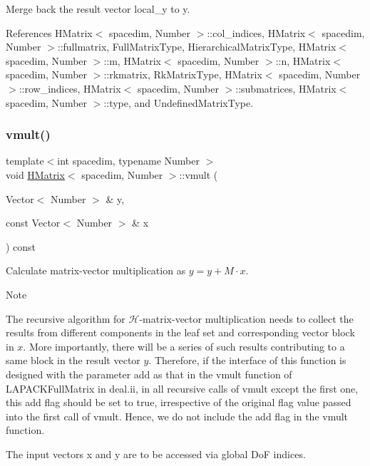 Merge back the result vector {\ttfamily local\+\_\+y} to {\ttfamily y}.

References H\+Matrix$<$ spacedim, Number $>$\+::col\+\_\+indices, H\+Matrix$<$ spacedim, Number $>$\+::fullmatrix, Full\+Matrix\+Type, Hierarchical\+Matrix\+Type, H\+Matrix$<$ spacedim, Number $>$\+::m, H\+Matrix$<$ spacedim, Number $>$\+::n, H\+Matrix$<$ spacedim, Number $>$\+::rkmatrix, Rk\+Matrix\+Type, H\+Matrix$<$ spacedim, Number $>$\+::row\+\_\+indices, H\+Matrix$<$ spacedim, Number $>$\+::submatrices, H\+Matrix$<$ spacedim, Number $>$\+::type, and Undefined\+Matrix\+Type.

\mbox{\label{classHMatrix_aa11b5761aba86606effd14b4bdf31912}} 
\subsubsection{\texorpdfstring{vmult()}{vmult()}\hspace{0.1cm}{\footnotesize\ttfamily [1/4]}}
{\footnotesize\ttfamily template$<$int spacedim, typename Number $>$ \\
void \hyperlink{classHMatrix}{H\+Matrix}$<$ spacedim, Number $>$\+::vmult (\begin{DoxyParamCaption}\item[{Vector$<$ Number $>$ \&}]{y,  }\item[{const Vector$<$ Number $>$ \&}]{x }\end{DoxyParamCaption}) const}

Calculate matrix-\/vector multiplication as $y = y + M \cdot x$.


\begin{DoxyDescription}
\item[Note ]
\begin{DoxyEnumerate}
\item The recursive algorithm for $\mathcal{H}$-\/matrix-\/vector multiplication needs to collect the results from different components in the leaf set and corresponding vector block in $x$. More importantly, there will be a series of such results contributing to a same block in the result vector $y$. Therefore, if the interface of this function is designed with the parameter {\ttfamily add} as that in the {\ttfamily vmult} function of {\ttfamily L\+A\+P\+A\+C\+K\+Full\+Matrix} in deal.\+ii, in all recursive calls of {\ttfamily vmult} except the first one, this {\ttfamily add} flag should be set to {\ttfamily true}, irrespective of the original flag value passed into the first call of {\ttfamily vmult}. Hence, we do not include the {\ttfamily add} flag in the {\ttfamily vmult} function.
\item The input vectors {\ttfamily x} and {\ttfamily y} are to be accessed via global DoF indices.  
\end{DoxyEnumerate}
\end{DoxyDescription}


